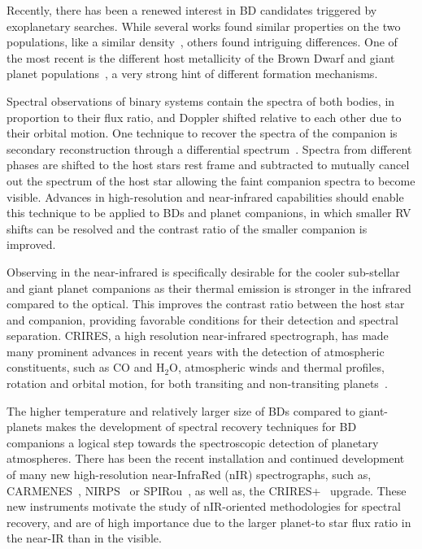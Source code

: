 \documentclass[fleqn,usenatbib]{mnras}
\begin{document}
Recently, there has been a renewed interest in BD candidates triggered by exoplanetary searches. While several works found similar properties on the two populations, like a similar density~\citep{hatzes_definition_2015}, others found intriguing differences. One of the most recent is the different host metallicity of the Brown Dwarf and giant planet populations~\citep{santos_observational_2017, schlaufman_evidence_2018}, a very strong hint of different formation mechanisms.

Spectral observations of binary systems contain the spectra of both bodies, in proportion to their flux ratio, and Doppler shifted relative to each other due to their orbital motion. One technique to recover the spectra of the companion is secondary reconstruction through a differential spectrum~\citep{ferluga_separating_1997}. Spectra from different phases are shifted to the host stars rest frame and subtracted to mutually cancel out the spectrum of the host star allowing the faint companion spectra to become visible. Advances in high-resolution and near-infrared capabilities should enable this technique to be applied to BDs and planet companions, in which smaller RV shifts can be resolved and the contrast ratio of the smaller companion is improved.

Observing in the near-infrared is specifically desirable for the cooler sub-stellar and giant planet companions as their thermal emission is stronger in the infrared compared to the optical. This improves the contrast ratio between the host star and companion, providing favorable conditions for their detection and spectral separation. CRIRES, a high resolution near-infrared spectrograph, has made many prominent advances in recent years with the detection of atmospheric constituents, such as \(\textrm{CO} \) and \(\textrm{H}_{2}\textrm{O} \), atmospheric winds and thermal profiles, rotation and orbital motion, for both transiting and non-transiting planets~\citep[e.g.][]{snellen_orbital_2010, brogi_signature_2012, rodler_weighing_2012, dekok_detection_2013, brogi_carbon_2014, snellen_fast_2014, piskorz_evidence_2016, brogi_rotation_2016}.

The higher temperature and relatively larger size of BDs compared to giant-planets makes the development of spectral recovery techniques for BD companions a logical step towards the spectroscopic detection of planetary atmospheres. There has been the recent installation and continued development of many new high-resolution near-InfraRed (nIR) spectrographs, such as, CARMENES~\citep{quirrenbach_carmenes_2014}, NIRPS~\citep{bouchy_nearinfrared_2017} or SPIRou~\citep{artigau_spirou_2014}, as well as, the CRIRES+~\citep{dorn_crires_2016} upgrade. These new instruments motivate the study of nIR-oriented methodologies for spectral recovery, and are of high importance due to the larger planet-to star flux ratio in the near-IR than in the visible.
\end{document}
